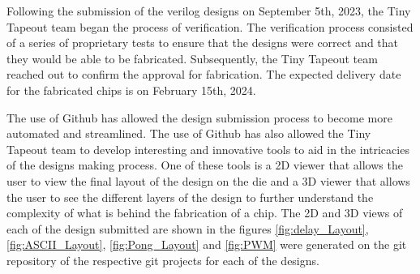 Following the submission of the verilog designs on September 5th, 2023, the Tiny Tapeout team began the process of verification. 
The verification process consisted of a series of proprietary tests to ensure that the designs were correct and that they would be able to be fabricated.
Subsequently, the Tiny Tapeout team reached out to confirm the approval for fabrication. The expected delivery date for the fabricated chips is on February 15th, 2024.

The use of Github has allowed the design submission process to become more automated and streamlined. The use of Github has also allowed the Tiny Tapeout team to develop 
interesting and innovative tools to aid in the intricacies of the designs making process. One of these tools is a 2D viewer that allows the user to view the final 
layout of the design on the die and a 3D viewer that allows the user to see the different layers of the design to further understand the complexity of what is behind the 
fabrication of a chip. The 2D and 3D views of each of the design submitted are shown in the figures \ref*{fig:delay_Layout}, \ref*{fig:ASCII_Layout}, \ref*{fig:Pong_Layout} and \ref*{fig:PWM} 
were generated on the git repository of the respective git projects for each of the designs.

